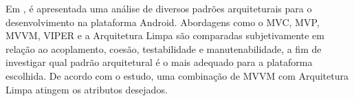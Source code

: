 Em , é apresentada uma análise de diversos padrões arquiteturais para o desenvolvimento na plataforma Android.
Abordagens como o MVC, MVP, MVVM, VIPER e a Arquitetura Limpa são comparadas subjetivamente em relação ao acoplamento, coesão, testabilidade e manutenabilidade, a fim de investigar qual padrão arquitetural é o mais adequado para a plataforma escolhida.
De acordo com o estudo, uma combinação de MVVM com Arquitetura Limpa atingem os atributos desejados.